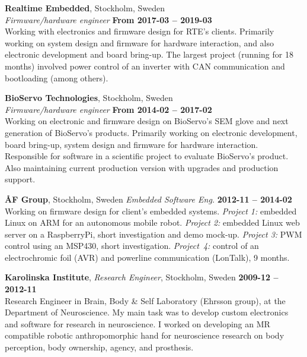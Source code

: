 \documentclass[a4paper,margin,line]{res} \usepackage{latexsym}
\begin{document}
\begin{resume}
{\bf Realtime Embedded}, Stockholm, Sweden\\
{\em Firmware/hardware engineer} \hfill {\bf From 2017-03 --
  2019-03}\\ Working with electronics and firmware design for RTE's
clients. Primarily working on system design and firmware for hardware
interaction, and also electronic development and board bring-up. The
largest project (running for 18 months) involved power control of an
inverter with CAN communication and bootloading (among others).

{\bf BioServo Technologies}, Stockholm, Sweden\\
{\em Firmware/hardware engineer} \hfill {\bf From 2014-02 --
  2017-02}\\ Working on electronic and firmware design on BioServo's
SEM glove and next generation of BioServo's products.  Primarily
working on electronic development, board bring-up, system design and
firmware for hardware interaction. Responsible for software in a
scientific project to evaluate BioServo's product.  Also maintaining
current production version with upgrades and production support.


{\bf {\AA}F Group}, Stockholm, Sweden
{\em Embedded Software Eng.} \hfill {\bf 2012-11 -- 2014-02}\\ Working
on firmware design for client's embedded systems.  {\em Project 1:}
embedded Linux on ARM for an autonomous mobile robot.  {\em Project
  2:} embedded Linux web server on a RaspberryPi, short investigation
and demo mock-up.  {\em Project 3:} PWM control using an MSP430, short
investigation.  {\em Project~4:} control of an electrochromic foil
(AVR) and powerline communication (LonTalk), 9 months.


{\bf Karolinska Institute}, {\em Research Engineer}, Stockholm, Sweden
\hfill {\bf 2009-12 -- 2012-11}\\ Research Engineer in Brain, Body \&
Self Laboratory (Ehrsson group), at the Department of Neuroscience.
My main task was to develop custom electronics and software for
research in neuroscience.  I worked on developing an MR compatible
robotic anthropomorphic hand for neuroscience research on body
perception, body ownership, agency, and prosthesis.


\end{resume}
\end{document}
